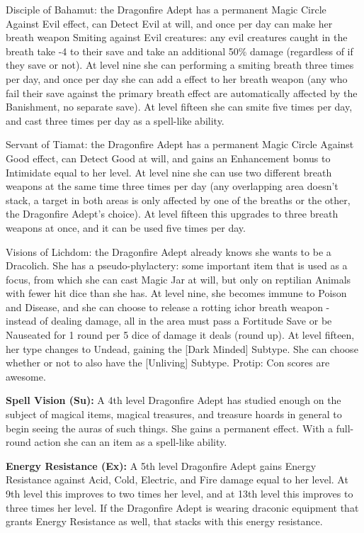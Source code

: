 \begin{description*}
\item[Disciple of Bahamut:] the Dragonfire Adept has a permanent Magic Circle Against Evil effect, can Detect Evil at will, and once per day can make her breath weapon Smiting against Evil creatures: any evil creatures caught in the breath take -4 to their save and take an additional 50\% damage (regardless of if they save or not). At level nine she can performing a smiting breath three times per day, and once per day she can add a  effect to her breath weapon (any who fail their save against the primary breath effect are automatically affected by the Banishment, no separate save). At level fifteen she can smite five times per day, and cast  three times per day as a spell-like ability.
\item[Servant of Tiamat:] the Dragonfire Adept has a permanent Magic Circle Against Good effect, can Detect Good at will, and gains an Enhancement bonus to Intimidate equal to her level. At level nine she can use two different breath weapons at the same time three times per day (any overlapping area doesn't stack, a target in both areas is only affected by one of the breaths or the other, the Dragonfire Adept's choice). At level fifteen this upgrades to three breath weapons at once, and it can be used five times per day.
\item[Visions of Lichdom:] the Dragonfire Adept already knows she wants to be a Dracolich. She has a pseudo-phylactery: some important item that is used as a focus, from which she can cast Magic Jar at will, but only on reptilian Animals with fewer hit dice than she has. At level nine, she becomes immune to Poison and Disease, and she can choose to release a rotting ichor breath weapon - instead of dealing damage, all in the area must pass a Fortitude Save or be Nauseated for 1 round per 5 dice of damage it deals (round up). At level fifteen, her type changes to Undead, gaining the [Dark Minded] Subtype. She can choose whether or not to also have the [Unliving] Subtype. Protip: Con scores are awesome.
\end{description*}

\textbf{Spell Vision (Su):} A 4th level Dragonfire Adept has studied enough on the subject of magical items, magical treasures, and treasure hoards in general to begin seeing the auras of such things. She gains a permanent  effect. With a full-round action she can  an item as a spell-like ability.

\textbf{Energy Resistance (Ex):} A 5th level Dragonfire Adept gains Energy Resistance against Acid, Cold, Electric, and Fire damage equal to her level. At 9th level this improves to two times her level, and at 13th level this improves to three times her level. If the Dragonfire Adept is wearing draconic equipment that grants Energy Resistance as well, that stacks with this energy resistance.

